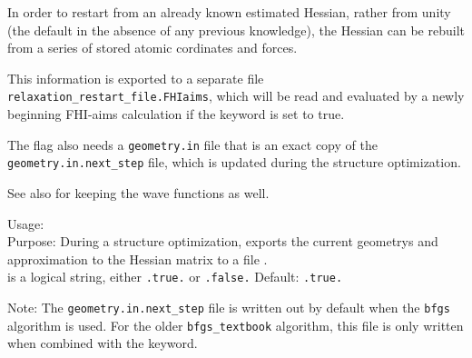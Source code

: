 In order to restart
from an already known estimated Hessian, rather from unity (the
default in the absence of any previous knowledge), the Hessian can be
rebuilt from a series of stored atomic cordinates and forces.  

This information is exported to a separate file
\texttt{relaxation\_restart\_file.FHIaims}, which will be read and
evaluated by a newly beginning FHI-aims calculation if the
 keyword is set to true.

The flag also needs a \texttt{geometry.in} file that is an exact copy
of the \texttt{geometry.in.next\_step} file, which is updated during
the structure optimization.

See also  for keeping the wave functions as well. 

{
  \noindent
  Usage:   \\
  Purpose: During a structure optimization, exports the current
  geometrys and approximation to the Hessian matrix to a file 
  . \\ 
   is a logical string, either \texttt{.true.} or
    \texttt{.false.} Default: \texttt{.true.} \\
}

Note: The \texttt{geometry.in.next\_step} file is written out by
default when the  \texttt{bfgs} algorithm
is used. For the older \texttt{bfgs\_textbook} algorithm, this file is
only written when combined with the 
keyword. 

